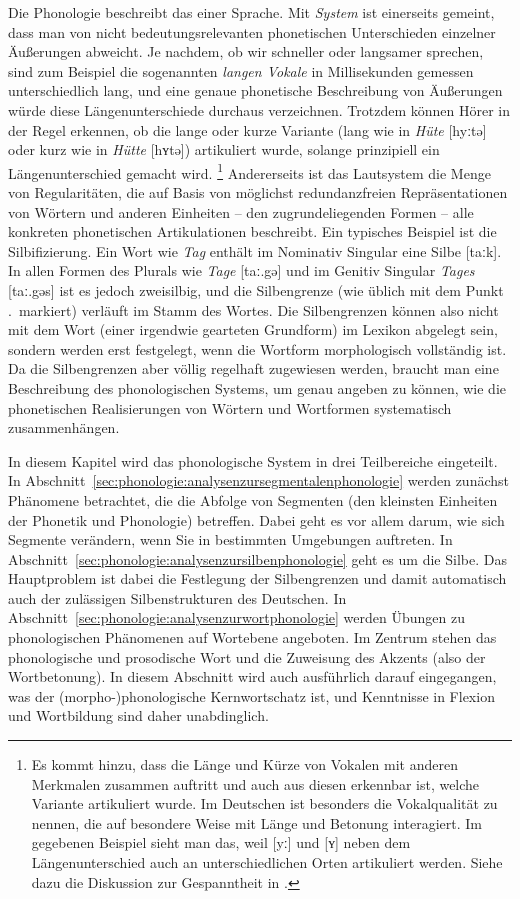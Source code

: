 Die Phonologie beschreibt das  einer Sprache.
Mit \textit{System} ist einerseits gemeint, dass man von nicht bedeutungsrelevanten phonetischen Unterschieden einzelner Äußerungen abweicht.
Je nachdem, ob wir schneller oder langsamer sprechen, sind zum Beispiel die sogenannten \textit{langen Vokale} in Millisekunden gemessen unterschiedlich lang, und eine genaue phonetische Beschreibung von Äußerungen würde diese Längenunterschiede durchaus verzeichnen.
Trotzdem können Hörer in der Regel erkennen, ob die lange oder kurze Variante (lang wie in \textit{Hüte} [hyːtə] oder kurz wie in \textit{Hütte} [hʏtə]) artikuliert wurde, solange prinzipiell ein Längenunterschied gemacht wird.%
\footnote{Es kommt hinzu, dass die Länge und Kürze von Vokalen mit anderen Merkmalen zusammen auftritt und auch aus diesen erkennbar ist, welche Variante artikuliert wurde.
Im Deutschen ist besonders die Vokalqualität zu nennen, die auf besondere Weise mit Länge und Betonung interagiert.
Im gegebenen Beispiel sieht man das, weil [yː] und [ʏ] neben dem Längenunterschied auch an unterschiedlichen Orten artikuliert werden.
Siehe dazu die Diskussion zur Gespanntheit in .}
Andererseits ist das Lautsystem die Menge von Regularitäten, die auf Basis von möglichst redundanzfreien Repräsentationen von Wörtern und anderen Einheiten -- den zugrundeliegenden Formen -- alle konkreten phonetischen Artikulationen beschreibt.
Ein typisches Beispiel ist die Silbifizierung.
Ein Wort wie \textit{Tag} enthält im Nominativ Singular eine Silbe [taːk].
In allen Formen des Plurals wie \textit{Tage} [taː.gə] und im Genitiv Singular \textit{Tages} [taː.gəs] ist es jedoch zweisilbig, und die Silbengrenze (wie üblich mit dem Punkt .\ markiert) verläuft im Stamm des Wortes.
Die Silbengrenzen können also nicht mit dem Wort (einer irgendwie gearteten Grundform) im Lexikon abgelegt sein, sondern werden erst festgelegt, wenn die Wortform morphologisch vollständig ist.
Da die Silbengrenzen aber völlig regelhaft zugewiesen werden, braucht man eine Beschreibung des phonologischen Systems, um genau angeben zu können, wie die phonetischen Realisierungen von Wörtern und Wortformen systematisch zusammenhängen.

In diesem Kapitel wird das phonologische System in drei Teilbereiche eingeteilt.
In Abschnitt~\ref{sec:phonologie:analysenzursegmentalenphonologie} werden zunächst Phänomene betrachtet, die die Abfolge von Segmenten (den kleinsten Einheiten der Phonetik und Phonologie) betreffen.
Dabei geht es vor allem darum, wie sich Segmente verändern, wenn Sie in bestimmten Umgebungen auftreten.
In Abschnitt~\ref{sec:phonologie:analysenzursilbenphonologie} geht es um die Silbe.
Das Hauptproblem ist dabei die Festlegung der Silbengrenzen und damit automatisch auch der zulässigen Silbenstrukturen des Deutschen.
In Abschnitt~\ref{sec:phonologie:analysenzurwortphonologie} werden Übungen zu phonologischen Phänomenen auf Wortebene angeboten.
Im Zentrum stehen das phonologische und prosodische Wort und die Zuweisung des Akzents (also der Wortbetonung).
In diesem Abschnitt wird auch ausführlich darauf eingegangen, was der (morpho-)phonologische Kernwortschatz ist, und Kenntnisse in Flexion und Wortbildung sind daher unabdinglich.

